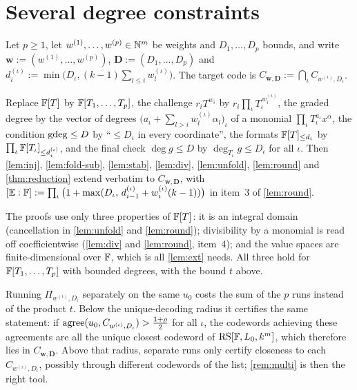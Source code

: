 \section{Several degree constraints}

Let $p\ge1$, let $w^{(1)},\dots,w^{(p)}\in\mathbb{N}^m$ be weights and $D_1,\dots,D_p$ bounds, and
write $\mathbf w:=(w^{(1)},\dots,w^{(p)})$, $\mathbf D:=(D_1,\dots,D_p)$ and $d^{(\iota)}_i:=\min\big(D_{\iota},(k-1)\sum_{l\le i}w^{(\iota)}_l\big)$. The target code is $C_{\mathbf w,\mathbf D}:=\bigcap_{\iota}C_{w^{(\iota)},D_{\iota}}$.

\begin{remark}\label{rem:multi}
Replace $\mathbb{F}[T]$ by $\mathbb{F}[T_1,\dots,T_p]$, the challenge $r_iT^{w_i}$ by
$r_i\prod_{\iota}T_{\iota}^{\,w^{(\iota)}_i}$, the graded degree by the vector of degrees
$\big(a_{\iota}+\sum_{l>i}w^{(\iota)}_l\alpha_l\big)_{\iota}$ of a monomial $\prod_{\iota}T_{\iota}^{a_{\iota}}x^\alpha$, the
condition $\mathrm{gdeg}\le D$ by ``$\le D_{\iota}$ in every coordinate'', the formats $\mathbb{F}[T]_{\le d_i}$ by
$\prod_{\iota}\mathbb{F}[T_{\iota}]_{\le d^{(\iota)}_i}$, and the final check $\deg g\le D$ by $\deg_{T_{\iota}}g\le D_{\iota}$
for all $\iota$. Then \cref{lem:inj}, \cref{lem:fold-sub}, \cref{lem:stab}, \cref{lem:div},
\cref{lem:unfold}, \cref{lem:round} and \cref{thm:reduction} extend verbatim to
$C_{\mathbf w,\mathbf D}$, with $[\mathbb{E}:\mathbb{F}]:=\prod_{\iota}\big(1+\max(D_{\iota},\,d^{(\iota)}_{i-1}+w^{(\iota)}_i(k-1))\big)$
in item~3 of \cref{lem:round}.


The proofs use only three properties of $\mathbb{F}[T]$: it is an integral domain (cancellation in
\cref{lem:unfold} and \cref{lem:round}); divisibility by a monomial is read off coefficientwise
(\cref{lem:div} and \cref{lem:round}, item~4); and the value spaces are finite-dimensional over
$\mathbb{F}$, which is all \cref{lem:ext} needs. All three hold for $\mathbb{F}[T_1,\dots,T_p]$ with bounded
degrees, with the bound $t$ above.
\end{remark}

\begin{remark}\label{rem:separate}
Running $\Pi_{w^{(\iota)},D_{\iota}}$ separately on the same $u_0$ costs the sum of the $p$ runs instead
of the product $t$. Below the unique-decoding radius it certifies the same statement: if
$\mathrm{agree}(u_0,C_{w^{(\iota)},D_{\iota}})>\frac{1+\rho}2$ for all $\iota$, the codewords achieving these
agreements are all the unique closest codeword of $\mathrm{RS}[\mathbb{F},L_0,k^m]$, which therefore lies in
$C_{\mathbf w,\mathbf D}$. Above that radius, separate runs only certify closeness to each
$C_{w^{(\iota)},D_{\iota}}$, possibly through different codewords of the list; \cref{rem:multi} is then
the right tool.
\end{remark}
